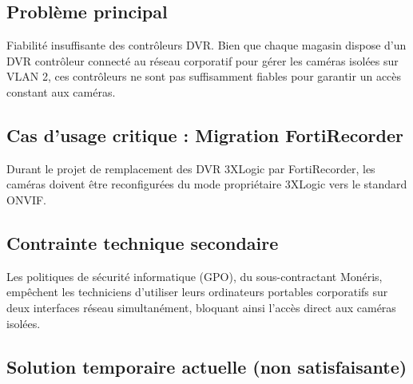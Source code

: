 \documentclass{UTT-Books-44}
\begin{document}

\subsection{Problème principal} 
Fiabilité insuffisante des contrôleurs DVR. Bien que chaque magasin dispose d'un DVR contrôleur connecté au réseau corporatif pour gérer les caméras isolées sur VLAN 2, ces contrôleurs ne sont pas suffisamment fiables pour garantir un accès constant aux caméras.

\subsection{Cas d'usage critique : Migration FortiRecorder}

Durant le projet de remplacement des DVR 3XLogic par FortiRecorder, les caméras doivent être reconfigurées du mode propriétaire 3XLogic vers le standard ONVIF. 


\subsection{Contrainte technique secondaire}

Les politiques de sécurité informatique (GPO), du sous-contractant Monéris, empêchent les techniciens d'utiliser leurs ordinateurs portables corporatifs sur deux interfaces réseau simultanément, bloquant ainsi l'accès direct aux caméras isolées.

\subsection{Solution temporaire actuelle (non satisfaisante)}

\end{document}
